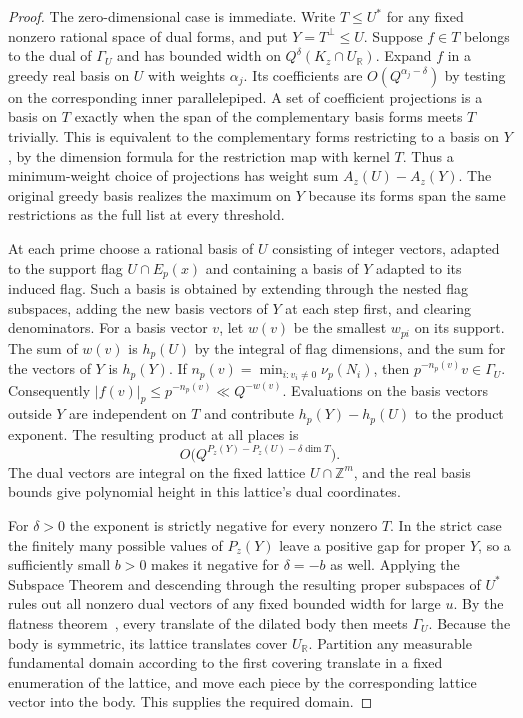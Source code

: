 \documentclass[11pt,reqno,a4paper]{amsart}
\theoremstyle{remark}
\numberwithin{equation}{section}
\begin{document}
\begin{proof}
The zero-dimensional case is immediate. Write $T\le U^*$ for any
fixed nonzero rational space of dual forms, and put $Y=T^\perp\le U$.
Suppose $f\in T$ belongs to the dual of $\Gamma_U$ and has bounded
width on $Q^\delta(K_z\cap U_{\mathbb R})$. Expand $f$ in a greedy
real basis on $U$ with weights $\alpha_j$. Its coefficients are
$O(Q^{\alpha_j-\delta})$ by testing on the corresponding inner
parallelepiped. A set of coefficient projections is a basis on $T$
exactly when the span of the complementary basis forms meets $T$
trivially. This is equivalent to the complementary forms restricting
to a basis on $Y$, by the dimension formula for the restriction map
with kernel $T$. Thus a minimum-weight choice of projections has
weight sum $A_z(U)-A_z(Y)$. The original greedy basis realizes the
maximum on $Y$ because its forms span the same restrictions as the
full list at every threshold.

At each prime choose a rational basis of $U$ consisting of integer
vectors, adapted to the support flag $U\cap E_p(x)$ and containing
a basis of $Y$ adapted to its induced flag. Such a basis is obtained
by extending through the nested flag subspaces, adding the new
basis vectors of $Y$ at each step first, and clearing denominators.
For a basis vector $v$, let $w(v)$ be the smallest $w_{pi}$ on its
support. The sum of $w(v)$ is $h_p(U)$ by the integral of flag
dimensions, and the sum for the vectors of $Y$ is $h_p(Y)$. If
$n_p(v)=\min_{i:v_i\ne0}\nu_p(N_i)$, then $p^{-n_p(v)}v\in\Gamma_U$.
Consequently $|f(v)|_p\le p^{-n_p(v)}\ll Q^{-w(v)}$. Evaluations on
the basis vectors outside $Y$ are independent on $T$ and contribute
$h_p(Y)-h_p(U)$ to the product exponent. The resulting product at
all places is
\begin{equation}\label{eq:core-dual}
 O\bigl(Q^{P_z(Y)-P_z(U)-\delta\dim T}\bigr).
\end{equation}
The dual vectors are integral on the fixed lattice
$U\cap\mathbb Z^m$, and the real basis bounds give polynomial height
in this lattice's dual coordinates.

For $\delta>0$ the exponent is strictly negative for every nonzero
$T$. In the strict case the finitely many possible values of
$P_z(Y)$ leave a positive gap for proper $Y$, so a sufficiently
small $b>0$ makes it negative for $\delta=-b$ as well. Applying
the Subspace Theorem and descending through the resulting proper
subspaces of $U^*$ rules out all nonzero dual vectors of any fixed
bounded width for large $u$. By the flatness theorem~\cite{KL},
every translate of the dilated body then meets $\Gamma_U$.
Because the body is symmetric, its lattice translates cover
$U_{\mathbb R}$. Partition any measurable fundamental domain
according to the first covering translate in a fixed enumeration
of the lattice, and move each piece by the corresponding lattice
vector into the body. This supplies the required domain.
\end{proof}
\end{document}
